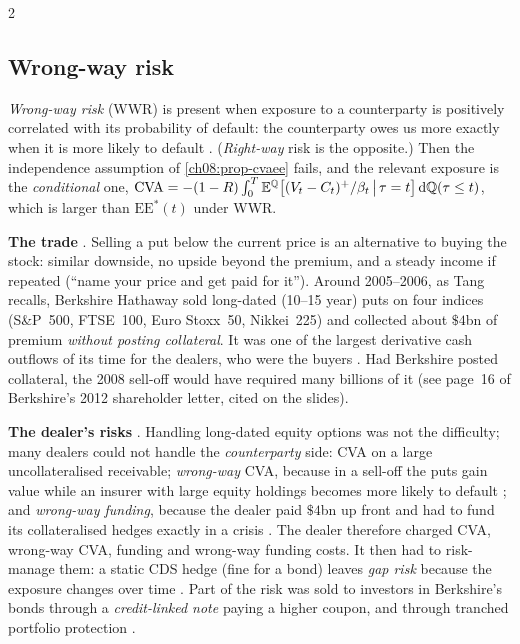\begin{paracol}{2}
\subsection{Wrong-way risk}\label{ch08:sec-wwr}
\begin{definition}
\emph{Wrong-way risk} (WWR) is present when exposure to a counterparty is positively correlated with its
probability of default: the counterparty owes us more exactly when it is more likely to default
. (\emph{Right-way} risk is the opposite.) Then the independence assumption of
\cref{ch08:prop-cvaee} fails, and the relevant exposure is the \emph{conditional} one,
$\mathrm{CVA}=-(1-R)\int_0^T\mathbb{E}^{\mathbb{Q}}\bigl[(V_t-C_t)^+/\beta_t\,\big|\,\tau=t\bigr]\,\mathrm{d}\mathbb{Q}(\tau\le t)$, which is
larger than $\mathrm{EE}^*(t)$ under WWR.
\end{definition}

\begin{casestudy}
\textbf{The trade} . Selling a put below the current price is an alternative to buying the
stock: similar downside, no upside beyond the premium, and a steady income if repeated (``name your price and
get paid for it''). Around 2005--2006, as Tang recalls, Berkshire Hathaway sold long-dated (10--15 year) puts on
four indices (S\&P~500, FTSE~100, Euro Stoxx~50, Nikkei~225) and collected about $\$4$bn of premium \emph{without
posting collateral}. It was one of the largest derivative cash outflows of its time for the dealers, who were the
buyers . Had Berkshire posted collateral, the 2008 sell-off would have required many billions of
it (see page~16 of Berkshire's 2012 shareholder letter, cited on the slides).

\textbf{The dealer's risks} . Handling long-dated equity options was not the difficulty; many dealers
could not handle the \emph{counterparty} side: CVA on a large uncollateralised receivable; \emph{wrong-way} CVA,
because in a sell-off the puts gain value while an insurer with large equity holdings becomes more likely to
default ; and \emph{wrong-way funding}, because the dealer paid $\$4$bn up front and had to fund
its collateralised hedges exactly in a crisis . The dealer therefore charged CVA, wrong-way CVA,
funding and wrong-way funding costs. It then had to risk-manage them: a static CDS hedge (fine for a bond) leaves
\emph{gap risk} because the exposure changes over time . Part of the risk was sold to investors
in Berkshire's bonds through a \emph{credit-linked note} paying a higher coupon, and through tranched portfolio
protection .


\end{casestudy}
\end{paracol}
